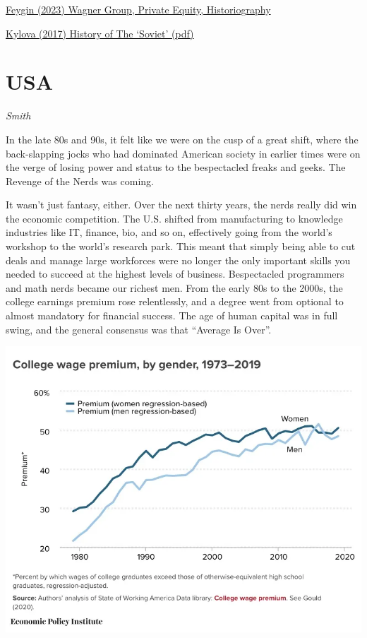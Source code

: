 \documentclass[
]{book}
\begin{document}
\href{https://building-a-ruin.ghost.io/wagner-political-economy-historiography}{Feygin (2023) Wagner Group, Private Equity, Historiography}

\href{pdf/Krylova_2017_History_of_The_Soviet.pdf}{Kylova (2017) History of The `Soviet' (pdf)}

\hypertarget{usa}{%
\chapter{USA}\label{usa}}

\emph{Smith}

In the late 80s and 90s, it felt like we were on the cusp of a great shift, where the back-slapping jocks who had dominated American society in earlier times were on the verge of losing power and status to the bespectacled freaks and geeks. The Revenge of the Nerds was coming.

It wasn't just fantasy, either. Over the next thirty years, the nerds really did win the economic competition. The U.S. shifted from manufacturing to knowledge industries like IT, finance, bio, and so on, effectively going from the world's workshop to the world's research park. This meant that simply being able to cut deals and manage large workforces were no longer the only important skills you needed to succeed at the highest levels of business. Bespectacled programmers and math nerds became our richest men. From the early 80s to the 2000s, the college earnings premium rose relentlessly, and a degree went from optional to almost mandatory for financial success.
The age of human capital was in full swing, and the general consensus was that ``Average Is Over''.

\includegraphics{fig/US_College_Wage_Premium_1980-2020.png}
\end{document}
